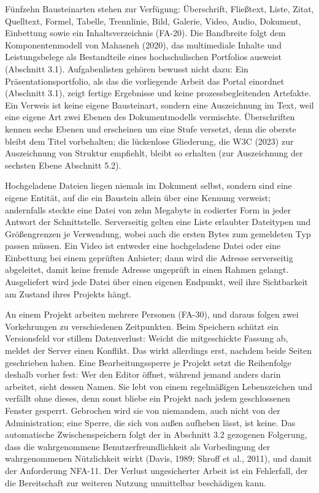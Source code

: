 Fünfzehn Bausteinarten stehen zur Verfügung: Überschrift, Fließtext, Liste, Zitat, Quelltext, Formel, Tabelle, Trennlinie, Bild, Galerie, Video, Audio, Dokument, Einbettung sowie ein Inhaltsverzeichnis (FA-20). Die Bandbreite folgt dem Komponentenmodell von Mahasneh (2020), das multimediale Inhalte und Leistungsbelege als Bestandteile eines hochschulischen Portfolios ausweist (Abschnitt 3.1). Aufgabenlisten gehören bewusst nicht dazu: Ein Präsentationsportfolio, als das die vorliegende Arbeit das Portal einordnet (Abschnitt 3.1), zeigt fertige Ergebnisse und keine prozessbegleitenden Artefakte. Ein Verweis ist keine eigene Bausteinart, sondern eine Auszeichnung im Text, weil eine eigene Art zwei Ebenen des Dokumentmodells vermischte. Überschriften kennen sechs Ebenen und erscheinen um eine Stufe versetzt, denn die oberste bleibt dem Titel vorbehalten; die lückenlose Gliederung, die W3C (2023) zur Auszeichnung von Struktur empfiehlt, bleibt so erhalten (zur Auszeichnung der sechsten Ebene Abschnitt 5.2).

Hochgeladene Dateien liegen niemals im Dokument selbst, sondern sind eine eigene Entität, auf die ein Baustein allein über eine Kennung verweist; andernfalls steckte eine Datei von zehn Megabyte in codierter Form in jeder Antwort der Schnittstelle. Serverseitig gelten eine Liste erlaubter Dateitypen und Größengrenzen je Verwendung, wobei auch die ersten Bytes zum gemeldeten Typ passen müssen. Ein Video ist entweder eine hochgeladene Datei oder eine Einbettung bei einem geprüften Anbieter; dann wird die Adresse serverseitig abgeleitet, damit keine fremde Adresse ungeprüft in einen Rahmen gelangt. Ausgeliefert wird jede Datei über einen eigenen Endpunkt, weil ihre Sichtbarkeit am Zustand ihres Projekts hängt.

An einem Projekt arbeiten mehrere Personen (FA-30), und daraus folgen zwei Vorkehrungen zu verschiedenen Zeitpunkten. Beim Speichern schützt ein Versionsfeld vor stillem Datenverlust: Weicht die mitgeschickte Fassung ab, meldet der Server einen Konflikt. Das wirkt allerdings erst, nachdem beide Seiten geschrieben haben. Eine Bearbeitungssperre je Projekt setzt die Reihenfolge deshalb vorher fest: Wer den Editor öffnet, während jemand anders darin arbeitet, sieht dessen Namen. Sie lebt von einem regelmäßigen Lebenszeichen und verfällt ohne dieses, denn sonst bliebe ein Projekt nach jedem geschlossenen Fenster gesperrt. Gebrochen wird sie von niemandem, auch nicht von der Administration; eine Sperre, die sich von außen aufheben lässt, ist keine. Das automatische Zwischenspeichern folgt der in Abschnitt 3.2 gezogenen Folgerung, dass die wahrgenommene Benutzerfreundlichkeit als Vorbedingung der wahrgenommenen Nützlichkeit wirkt (Davis, 1989; Shroff et al., 2011), und damit der Anforderung NFA-11. Der Verlust ungesicherter Arbeit ist ein Fehlerfall, der die Bereitschaft zur weiteren Nutzung unmittelbar beschädigen kann.

